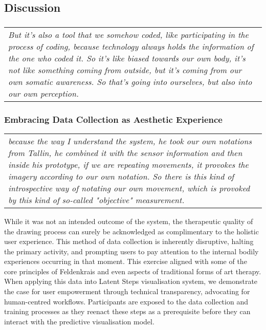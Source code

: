 \subsection{Discussion}

\subsubsection{}

\begin{center}
\begin{tabular}{ p{13cm}}
\textit{But it's also a tool that we somehow coded, like participating in the process of coding, because technology always holds the information of the one who coded it. So it's like biased towards our own body, it's not like something coming from outside, but it's coming from our own somatic awareness. So that's going into ourselves, but also into our own perception.}
\end{tabular}
\end{center}

\subsubsection{Embracing Data Collection as Aesthetic Experience}

\begin{center}
\begin{tabular}{ p{13cm}}
\textit{because the way I understand the system, he took our own notations from Tallin, he combined it with the sensor information and then inside his prototype, if we are repeating movements, it provokes the imagery according to our own notation. So there is this kind of introspective way of notating our own movement, which is provoked by this kind of so-called "objective" measurement.}
\end{tabular}
\end{center}

While it was not an intended outcome of the system, the therapeutic quality of the drawing process can surely be acknowledged as complimentary to the holistic user experience. This method of data collection is inherently disruptive,  halting the primary activity, and prompting users to pay attention to the internal bodily experiences occurring in that moment. This exercise aligned with some of the core principles of Feldenkrais and even aspects of traditional forms of art therapy. When applying this data into Latent Steps visualisation system, we demonstrate the case for user empowerment through technical transparency, advocating for human-centred workflows. Participants are exposed to the data collection and training processes as they reenact these steps as a prerequisite before they can interact with the predictive visualisation model.   

